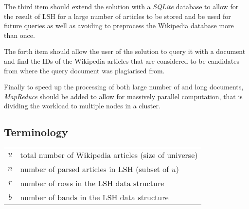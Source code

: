 The third item should extend the solution with a \emph{SQLite} database to allow for the result of LSH for a large number of articles to be stored and be used for future queries as well as avoiding to preprocess the Wikipedia database more than once. 

The forth item should allow the user of the solution to query it with a document and find the IDs of the Wikipedia articles that are considered to be candidates from where the query document was plagiarised from.

Finally to speed up the processing of both large number of and long documents, \emph{MapReduce} should be added to allow for massively parallel computation, that is dividing the workload to multiple nodes in a cluster.

\subsection{Terminology}
\begin{tabular}{cp{}}
  $u$ & total number of Wikipedia articles (size of universe) \\
  $n$ & number of parsed articles in LSH (subset of $u$) \\
  $r$ & number of rows in the LSH data structure \\
  $b$ & number of bands in the LSH data structure
\end{tabular}